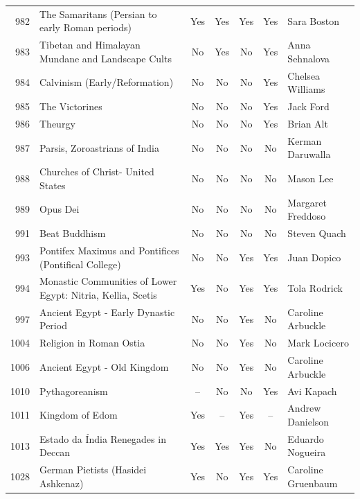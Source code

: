 {\begin{longtable}{rp{3.5cm}ccccp{3cm}}
982 & {\raggedright The Samaritans (Persian to early Roman periods)} & Yes & Yes & Yes & Yes & {\raggedright Sara Boston} \\
983 & {\raggedright Tibetan and Himalayan Mundane and Landscape Cults} & No & Yes & No & Yes & {\raggedright Anna Sehnalova} \\
984 & {\raggedright Calvinism (Early/Reformation)} & No & No & No & Yes & {\raggedright Chelsea Williams} \\
985 & {\raggedright The Victorines} & No & No & No & Yes & {\raggedright Jack Ford} \\
986 & {\raggedright Theurgy} & No & No & No & Yes & {\raggedright Brian Alt} \\
987 & {\raggedright Parsis, Zoroastrians of India} & No & No & No & No & {\raggedright Kerman Daruwalla} \\
988 & {\raggedright Churches of Christ- United States} & No & No & No & No & {\raggedright Mason Lee} \\
989 & {\raggedright Opus Dei} & No & No & No & No & {\raggedright Margaret Freddoso} \\
991 & {\raggedright Beat Buddhism} & No & No & No & No & {\raggedright Steven Quach} \\
993 & {\raggedright Pontifex Maximus and Pontifices (Pontifical College)} & No & No & Yes & Yes & {\raggedright Juan Dopico} \\
994 & {\raggedright Monastic Communities of Lower Egypt: Nitria, Kellia, Scetis} & Yes & No & Yes & Yes & {\raggedright Tola Rodrick} \\
997 & {\raggedright Ancient Egypt - Early Dynastic Period} & No & No & Yes & No & {\raggedright Caroline Arbuckle} \\
1004 & {\raggedright Religion in Roman Ostia} & No & No & Yes & No & {\raggedright Mark Locicero} \\
1006 & {\raggedright Ancient Egypt - Old Kingdom} & No & No & Yes & No & {\raggedright Caroline Arbuckle} \\
1010 & {\raggedright Pythagoreanism} & -- & No & No & Yes & {\raggedright Avi Kapach} \\
1011 & {\raggedright Kingdom of Edom} & Yes & -- & Yes & -- & {\raggedright Andrew Danielson} \\
1013 & {\raggedright Estado da Índia Renegades in Deccan} & Yes & Yes & Yes & No & {\raggedright Eduardo Nogueira} \\
1028 & {\raggedright German Pietists (Hasidei Ashkenaz)} & Yes & No & Yes & Yes & {\raggedright Caroline Gruenbaum} \\

\end{longtable}}
